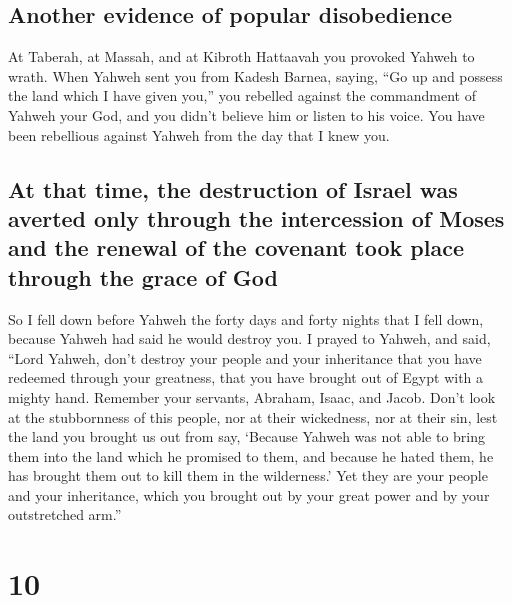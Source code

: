 \hypertarget{another-evidence-of-popular-disobedience}{%
\subsection{Another evidence of popular
disobedience}\label{another-evidence-of-popular-disobedience}}

 At Taberah, at Massah, and at Kibroth Hattaavah you
provoked Yahweh to wrath.  When Yahweh sent you from
Kadesh Barnea, saying, ``Go up and possess the land which I have given
you,'' you rebelled against the commandment of Yahweh your God, and you
didn't believe him or listen to his voice.  You have been
rebellious against Yahweh from the day that I knew you.

\hypertarget{at-that-time-the-destruction-of-israel-was-averted-only-through-the-intercession-of-moses-and-the-renewal-of-the-covenant-took-place-through-the-grace-of-god}{%
\subsection{At that time, the destruction of Israel was averted only
through the intercession of Moses and the renewal of the covenant took
place through the grace of
God}\label{at-that-time-the-destruction-of-israel-was-averted-only-through-the-intercession-of-moses-and-the-renewal-of-the-covenant-took-place-through-the-grace-of-god}}

 So I fell down before Yahweh the forty days and forty
nights that I fell down, because Yahweh had said he would destroy you.
 I prayed to Yahweh, and said, ``Lord Yahweh, don't
destroy your people and your inheritance that you have redeemed through
your greatness, that you have brought out of Egypt with a mighty hand.
 Remember your servants, Abraham, Isaac, and Jacob. Don't
look at the stubbornness of this people, nor at their wickedness, nor at
their sin,  lest the land you brought us out from say,
`Because Yahweh was not able to bring them into the land which he
promised to them, and because he hated them, he has brought them out to
kill them in the wilderness.'  Yet they are your people
and your inheritance, which you brought out by your great power and by
your outstretched arm.''

\hypertarget{section-9}{%
\section{10}\label{section-9}}

